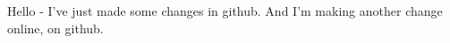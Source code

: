 \documentclass{article}
\begin{document}
Hello - I've just made some changes in github. And I'm making another change online, on github.
\end{document}
